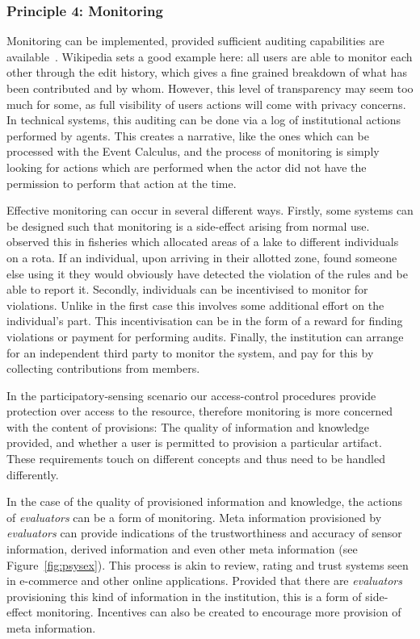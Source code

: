 \subsubsection*{Principle 4: Monitoring}

Monitoring can be implemented, provided sufficient auditing capabilities are available~\citep{Pitt2012b}. Wikipedia sets a good example here: all users are able to monitor each other through the edit history, which gives a fine grained breakdown of what has been contributed and by whom. However, this level of transparency may seem too much for some, as full visibility of users actions will come with privacy concerns. 
In technical systems, this auditing can be done via a log of institutional actions performed by agents. This creates a narrative, like the ones which can be processed with the Event Calculus, and the process of monitoring is simply looking for actions which are performed when the actor did not have the permission to perform that action at the time.

Effective monitoring can occur in several different ways. 
Firstly, some systems can be designed such that monitoring is a side-effect arising from normal use. 
 observed this in fisheries which allocated areas of a lake to different individuals on a rota. 
If an individual, upon arriving in their allotted zone, found someone else using it they would obviously have detected the violation of the rules and be able to report it. 
Secondly, individuals can be incentivised to monitor for violations. Unlike in the first case this involves some additional effort on the individual's part. 
This incentivisation can be in the form of a reward for finding violations or payment for performing audits. 
Finally, the institution can arrange for an independent third party to monitor the system, and pay for this by collecting contributions from members.

In the participatory-sensing scenario our access-control procedures provide protection over access to the resource, therefore monitoring is more concerned with the content of provisions: The quality of information and knowledge provided, and whether a user is permitted to provision a particular artifact. 
These requirements touch on different concepts and thus need to be handled differently. 

In the case of the quality of provisioned information and knowledge, the actions of \emph{evaluators} can be a form of monitoring. 
Meta information provisioned by \emph{evaluators} can provide indications of the trustworthiness and accuracy of sensor information, derived information and even other meta information (see Figure~\ref{fig:psysex}). 
This process is akin to review, rating and trust systems seen in e-commerce and other online applications. Provided that there are \emph{evaluators} provisioning this kind of information in the institution, this is a form of side-effect monitoring. 
Incentives can also be created to encourage more provision of meta information.

